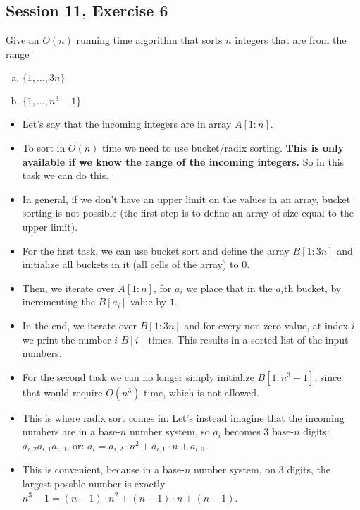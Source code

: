 \subsection {Session 11, Exercise 6}


Give an $O(n)$ running time algorithm that sorts $n$ integers that are from the range

\begin{enumerate}[a)]
    \item $\{1, \dots{}, 3n\}$
    \item $\{1, \dots{}, n^3-1\}$
\end{enumerate}


\begin{itemize}
    \item Let's say that the incoming integers are in array $A[1:n]$.
    \item To sort in $O(n)$ time we need to use bucket/radix sorting. \textbf{This is only available if we know the range of the incoming integers.} So in this task we can do this.
    \item In general, if we don't have an upper limit on the values in an array, bucket sorting is not possible (the first step is to define an array of size equal to the upper limit).
    \item For the first task, we can use bucket sort and define the array $B[1:3n]$ and initialize all buckets in it (all cells of the array) to $0$.
    \item Then, we iterate over $A[1:n]$, for $a_i$ we place that in the $a_i$th bucket, by incrementing the $B[a_i]$ value by $1$.
    \item In the end, we iterate over $B[1:3n]$ and for every non-zero value, at index $i$ we print the number $i$ $B[i]$ times. This results in a sorted list of the input numbers.
    \item For the second task we can no longer simply initialize $B[1:n^3-1]$, since that would require $O(n^3)$ time, which is not allowed.
    \item This is where radix sort comes in: Let's instead imagine that the incoming numbers are in a base-$n$ number system, so $a_i$ becomes $3$ base-$n$ digits: $a_{i,2}a_{i,1}a_{i,0}$, or: $a_i = a_{i,2}\cdot{}n^2 + a_{i,1}\cdot{}n + a_{i,0}$.
    \item This is convenient, because in a base-$n$ number system, on $3$ digits, the largest possble number is exactly $n^3-1 = (n-1)\cdot{}n^2 + (n-1)\cdot{}n + (n-1)$.

\end{itemize}
